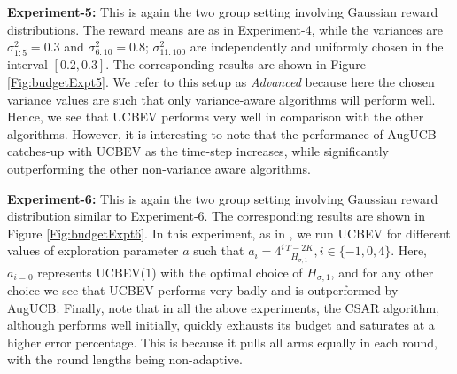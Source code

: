 \textbf{Experiment-5:} This is again the two group setting involving Gaussian reward distributions. The reward means are as in Experiment-4, while the 
variances are  $\sigma_{1:5}^{2}=0.3$ and $\sigma_{6:10}^{2}=0.8$;  $\sigma_{11:100}^{2}$ are independently and uniformly chosen in the interval $[0.2,0.3]$.  The corresponding results are shown in Figure \ref{Fig:budgetExpt5}.
 We refer to this setup as \emph{Advanced} because 
here the chosen variance values are such that only  variance-aware algorithms will perform well.
Hence, we see that UCBEV performs very well in comparison with the other algorithms. However,  it is interesting to note that the performance of  AugUCB catches-up with UCBEV as the time-step increases, while significantly outperforming the other non-variance aware algorithms.

\textbf{Experiment-6:} This is again the two group setting involving Gaussian reward distribution similar to Experiment-6. The corresponding results are shown in Figure \ref{Fig:budgetExpt6}. In this experiment, as in \cite{locatelli2016optimal}, we run UCBEV for different values of exploration parameter $a$ such that $ a_{i} = 4^{i} \frac{T-2K}{H_{\sigma,1}}, i \in \lbrace -1,0,4 \rbrace$. Here, $a_{i=0}$ represents UCBEV($1$) with the optimal choice of $H_{\sigma ,1}$, and for any other choice we see that UCBEV performs very badly and is outperformed by AugUCB. Finally, note that in all the above experiments, the CSAR algorithm, although performs well initially, quickly exhausts its budget and saturates at a higher error percentage. This is because it pulls all arms equally in each round, with the round lengths being non-adaptive.





